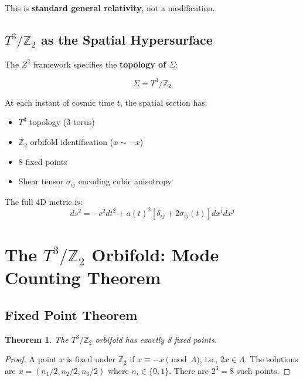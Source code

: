 \documentclass[12pt,a4paper]{article}
\newtheorem{theorem}{Theorem}[section]
\newcommand{\Ztwo}{\mathbb{Z}_2}
\newcommand{\Tthree}{T^3}
\newcommand{\Zsq}{Z^2}
\begin{document}
This is \textbf{standard general relativity}, not a modification.

\subsection{$\Tthree/\Ztwo$ as the Spatial Hypersurface}

The $\Zsq$ framework specifies the \textbf{topology of $\Sigma$}:

\begin{equation}
\Sigma = \Tthree/\Ztwo
\end{equation}

At each instant of cosmic time $t$, the spatial section has:
\begin{itemize}
    \item $\Tthree$ topology (3-torus)
    \item $\Ztwo$ orbifold identification ($x \sim -x$)
    \item 8 fixed points
    \item Shear tensor $\sigma_{ij}$ encoding cubic anisotropy
\end{itemize}

The full 4D metric is:
\begin{equation}
\boxed{ds^2 = -c^2 dt^2 + a(t)^2 \left[ \delta_{ij} + 2\sigma_{ij}(t) \right] dx^i dx^j}
\end{equation}

\section{The $\Tthree/\Ztwo$ Orbifold: Mode Counting Theorem}
\label{sec:orbifold}

\subsection{Fixed Point Theorem}

\begin{theorem}
The $\Tthree/\Ztwo$ orbifold has exactly 8 fixed points.
\end{theorem}

\begin{proof}
A point $x$ is fixed under $\Ztwo$ if $x \equiv -x \pmod{\Lambda}$, i.e., $2x \in \Lambda$. The solutions are $x = (n_1/2, n_2/2, n_3/2)$ where $n_i \in \{0,1\}$. There are $2^3 = 8$ such points.
\end{proof}
\end{document}
